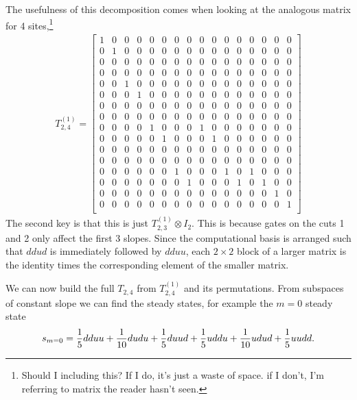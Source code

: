 The usefulness of this decomposition comes when looking at the analogous matrix for 4 sites,\footnote{Should I including this? If I do, it's just  a waste of space. if I don't, I'm referring to matrix the reader hasn't seen.}
\begin{align}
T_{2,4}^{(1)} =
\left[
\begin{array}{cccccccccccccccc}
1 & 0 & 0 & 0 & 0 & 0 & 0 & 0 & 0 & 0 & 0 & 0 & 0 & 0 & 0 & 0 \\
0 & 1 & 0 & 0 & 0 & 0 & 0 & 0 & 0 & 0 & 0 & 0 & 0 & 0 & 0 & 0 \\
0 & 0 & 0 & 0 & 0 & 0 & 0 & 0 & 0 & 0 & 0 & 0 & 0 & 0 & 0 & 0 \\
0 & 0 & 0 & 0 & 0 & 0 & 0 & 0 & 0 & 0 & 0 & 0 & 0 & 0 & 0 & 0 \\
0 & 0 & 1 & 0 & 0 & 0 & 0 & 0 & 0 & 0 & 0 & 0 & 0 & 0 & 0 & 0 \\
0 & 0 & 0 & 1 & 0 & 0 & 0 & 0 & 0 & 0 & 0 & 0 & 0 & 0 & 0 & 0 \\
0 & 0 & 0 & 0 & 0 & 0 & 0 & 0 & 0 & 0 & 0 & 0 & 0 & 0 & 0 & 0 \\
0 & 0 & 0 & 0 & 0 & 0 & 0 & 0 & 0 & 0 & 0 & 0 & 0 & 0 & 0 & 0 \\
0 & 0 & 0 & 0 & 1 & 0 & 0 & 0 & 1 & 0 & 0 & 0 & 0 & 0 & 0 & 0 \\
0 & 0 & 0 & 0 & 0 & 1 & 0 & 0 & 0 & 1 & 0 & 0 & 0 & 0 & 0 & 0 \\
0 & 0 & 0 & 0 & 0 & 0 & 0 & 0 & 0 & 0 & 0 & 0 & 0 & 0 & 0 & 0 \\
0 & 0 & 0 & 0 & 0 & 0 & 0 & 0 & 0 & 0 & 0 & 0 & 0 & 0 & 0 & 0 \\
0 & 0 & 0 & 0 & 0 & 0 & 1 & 0 & 0 & 0 & 1 & 0 & 1 & 0 & 0 & 0 \\
0 & 0 & 0 & 0 & 0 & 0 & 0 & 1 & 0 & 0 & 0 & 1 & 0 & 1 & 0 & 0 \\
0 & 0 & 0 & 0 & 0 & 0 & 0 & 0 & 0 & 0 & 0 & 0 & 0 & 0 & 1 & 0 \\
0 & 0 & 0 & 0 & 0 & 0 & 0 & 0 & 0 & 0 & 0 & 0 & 0 & 0 & 0 & 1 \\
\end{array}
\right]
\end{align}
The second key is that this is just $T_{2,3}^{(1)}\otimes I_2$. This is because gates on the cuts 1 and 2 only affect the first 3 slopes. Since the computational basis is arranged such that $ddud$ is immediately followed by $dduu$, each $2\times 2$ block of a larger matrix is the identity times the corresponding element of the smaller matrix.

We can now build the full $T_{2,4}$ from $T_{2,4}^{(1)}$ and its permutations. From subspaces of constant slope we can find the steady states, for example the $m=0$ steady state
\begin{align}
s_{m=0} = \frac{1}{5}dduu + \frac{1}{10}dudu + \frac{1}{5} duud + \frac{1}{5}uddu + \frac{1}{10}udud + \frac{1}{5}uudd.
\end{align}

